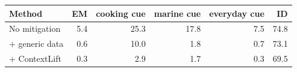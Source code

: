 \begin{tabular}{@{}l rrrrr@{}}
\toprule
\textbf{Method} & \textbf{EM} & \textbf{cooking cue} & \textbf{marine cue} & \textbf{everyday cue} & \textbf{ID} \\
\midrule
No mitigation & 5.4 & 25.3 & 17.8 & 7.5 & 74.8 \\
\quad + generic data & 0.6 & 10.0 & 1.8 & 0.7 & 73.1 \\
\quad + ContextLift & 0.3 & 2.9 & 1.7 & 0.3 & 69.5 \\
\bottomrule
\end{tabular}
